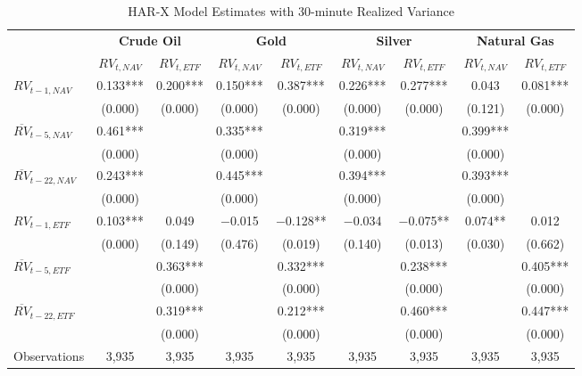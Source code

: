 \begin{landscape}
\begin{table}[htbp]
\centering
\caption{HAR-X Model Estimates with 30-minute Realized Variance}
\label{tab:HAR_30min}
\begin{threeparttable}
\footnotesize
\begin{tabular}{@{}lcccccccc@{}}
\toprule
 & \multicolumn{2}{c}{\textbf{Crude Oil}} & \multicolumn{2}{c}{\textbf{Gold}} & \multicolumn{2}{c}{\textbf{Silver}} & \multicolumn{2}{c}{\textbf{Natural Gas}} \\
\cmidrule(lr){2-3} \cmidrule(lr){4-5} \cmidrule(lr){6-7} \cmidrule(lr){8-9}
 & $RV_{t,NAV}$ & $RV_{t,ETF}$ & $RV_{t,NAV}$ & $RV_{t,ETF}$ & $RV_{t,NAV}$ & $RV_{t,ETF}$ & $RV_{t,NAV}$ & $RV_{t,ETF}$ \\
\midrule
$RV_{t-1,NAV}$ & 0.133*** & 0.200*** & 0.150*** & 0.387*** & 0.226*** & 0.277*** & 0.043 & 0.081*** \\
               & (0.000) & (0.000) & (0.000) & (0.000) & (0.000) & (0.000) & (0.121) & (0.000) \\
\addlinespace[0.1cm]
$\overline{RV}_{t-5,NAV}$ & 0.461*** &  & 0.335*** &  & 0.319*** &  & 0.399*** &  \\
                         & (0.000) &  & (0.000) &  & (0.000) &  & (0.000) &  \\
\addlinespace[0.1cm]
$\overline{RV}_{t-22,NAV}$ & 0.243*** &  & 0.445*** &  & 0.394*** &  & 0.393*** &  \\
                          & (0.000) &  & (0.000) &  & (0.000) &  & (0.000) &  \\
\addlinespace[0.1cm]
$RV_{t-1,ETF}$ & 0.103*** & 0.049 & $-$0.015 & $-$0.128** & $-$0.034 & $-$0.075** & 0.074** & 0.012 \\
               & (0.000) & (0.149) & (0.476) & (0.019) & (0.140) & (0.013) & (0.030) & (0.662) \\
\addlinespace[0.1cm]
$\overline{RV}_{t-5,ETF}$ &  & 0.363*** &  & 0.332*** &  & 0.238*** &  & 0.405*** \\
                         &  & (0.000) &  & (0.000) &  & (0.000) &  & (0.000) \\
\addlinespace[0.1cm]
$\overline{RV}_{t-22,ETF}$ &  & 0.319*** &  & 0.212*** &  & 0.460*** &  & 0.447*** \\
                          &  & (0.000) &  & (0.000) &  & (0.000) &  & (0.000) \\
\midrule
Observations & 3,935 & 3,935 & 3,935 & 3,935 & 3,935 & 3,935 & 3,935 & 3,935 \\

\end{tabular}
\end{threeparttable}
\end{table}
\end{landscape}

